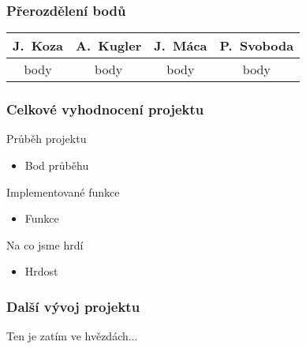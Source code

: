 \documentclass{beamer}
\begin{document}
\begin{frame}[allowframebreaks]\frametitle{Přerozdělení bodů}
    
    \begin{center}
  \begin{tabular}{| c | c | c | c |}
    \hline
     J.~Koza & A.~Kugler & J.~Máca & P.~Svoboda \\
    \hline
     body & body & body & body \\
    \hline
  \end{tabular}     
   \end{center}
\end{frame}

\begin{frame}[allowframebreaks]\frametitle{Celkové vyhodnocení projektu}

		\begin{block}{Průběh projektu}
			\begin{itemize}
				\item Bod průběhu
			\end{itemize}
		\end{block}
	
		\begin{block}{Implementované funkce}
			\begin{itemize}
				\item Funkce
			\end{itemize}
		\end{block}

		\begin{block}{Na co jsme hrdí}
			\begin{itemize}
				\item Hrdost
			\end{itemize}
		\end{block}
   
\end{frame}

\begin{frame}[allowframebreaks]\frametitle{Další vývoj projektu}
		
		Ten je zatím ve hvězdách...
		
\end{frame}
\end{document}

